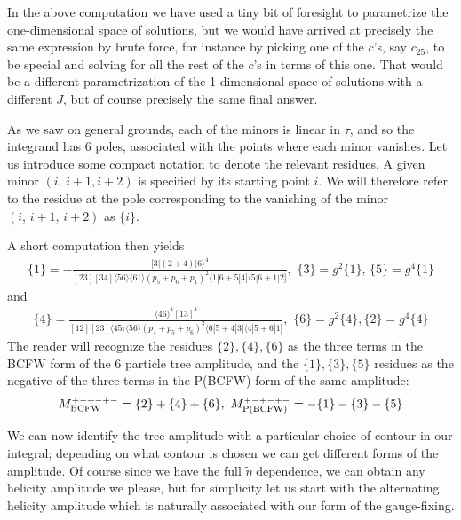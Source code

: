 \documentclass[12pt]{article}
\newcommand{\be}{\begin{eqnarray}}
\newcommand{\ee}{\end{eqnarray}}
\begin{document}
In the above computation we have used a tiny bit of foresight to parametrize the one-dimensional space of solutions, but we would have arrived at precisely the same expression by brute force, for instance by picking one of the $c$'s, say $c_{25}$, to be special and solving for all the rest of the $c$'s in terms of this one. That would be a different parametrization of the 1-dimensional space of solutions with a different $J$, but of course precisely the same final answer.

As we saw on general grounds, each of the minors is linear in $\tau$, and so the integrand has 6 poles, associated with the points where each minor vanishes. Let us introduce some compact notation to denote the relevant residues. A given minor $(i, \, i+1, i+2)$ is specified by its starting point $i$. We will therefore refer to the residue at the pole corresponding to the vanishing of the minor $(i, \, i+1, \, i+2)$ as $\{ i \}$.

A short computation then yields
\be
\{ 1 \} = - \frac{[3|(2+4)|6 \rangle^4}{[23][34]\langle 56 \rangle \langle 61 \rangle (p_5 + p_6 + p_1)^2 \langle 1 |6 + 5|4] \langle 5|6+ 1 |2]}, \, \, \{3 \} = g^2 \{ 1 \}, \, \{ 5 \} = g^4 \{ 1 \}
\ee
and
\be
\{4 \} = \frac{\langle 4 6 \rangle^4 [1 3]^4}{[12][23]\langle 45 \rangle \langle 56 \rangle (p_4 + p_5 + p_6)^2
\langle 6 |5 + 4|3] \langle 4|5 + 6 |1]}, \, \, \{ 6 \} = g^2 \{ 4 \}, \{ 2 \} = g^4 \{ 4 \}
\ee
The reader will recognize the residues $\{2 \},\{4 \},\{ 6 \}$ as the three terms in the BCFW form of the 6 particle tree amplitude, and the $\{1 \},\{ 3 \}, \{ 5 \}$ residues as the negative of the three terms in the P(BCFW) form of the same amplitude:
\be
M^{+-+-+-}_{{\rm BCFW}} = \{ 2 \} + \{ 4 \} + \{ 6 \}, \, \, M^{+-+-+-}_{{\rm P(BCFW)}} = - \{1 \} - \{ 3 \} - \{ 5 \}
\ee

We can now identify the tree amplitude with a particular choice of contour in our integral; depending on what contour is chosen we can get different 
forms of the amplitude. Of course since we have the full $\tilde \eta$ dependence, we can obtain any helicity amplitude we please, but for simplicity let us start with the alternating helicity amplitude which is naturally associated with our form of the  gauge-fixing.
\end{document}
